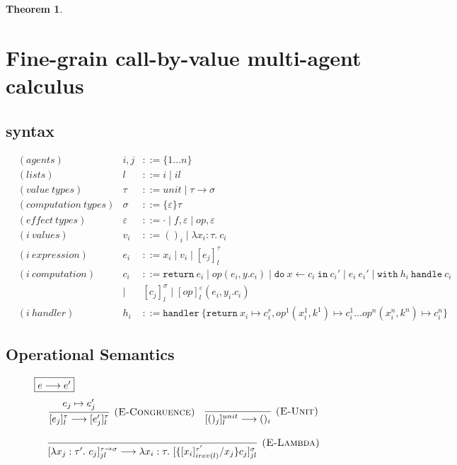 \documentclass{article}
\newtheorem{theorem}{Theorem}[section]
\begin{document}
\begin{theorem}



\newpage
\section{Fine-grain call-by-value multi-agent calculus}
\subsection{syntax}
\begin{align*}
&(agents) &i, j &::= \{1 \dots n\}\\
&(lists) & l &::= i \mid il\\
&(value\ types) &\tau &::= unit \mid \tau \rightarrow \sigma\\
&(computation\ types) &\sigma &::= \{\varepsilon\}\tau\\
&(effect\ types) &\varepsilon &::= \cdot \mid f, \varepsilon \mid op, \varepsilon\\
&(i\  values) &{v_i} &::= ()_i \mid \lambda x_i:\tau.\ c_i\\
&(i\ expression) &e_i &::= x_i \mid v_i \mid [e_j]^\tau_l \\
&(i\ computation) &c_i &::= \texttt{return}\ e_i \mid op(e_i, y.c_i) \mid \texttt{do}\ x \leftarrow c_i\ \texttt{in}\ c_i' \mid e_i\ e_i' \mid \texttt{with}\ h_i\ \texttt{handle}\ c_i\\
 &\ &\mid\ &[c_j]^\sigma_l \mid [op]^\varepsilon_l (e_i, y_i.c_i)\\
&(i\ handler) &h_i &::= \texttt{handler}\ \{\texttt{return}\ x_i \mapsto c^r_i, op^1(x_i^1, k^1) \mapsto c_i^1 \dots  op^n(x_i^n, k^n) \mapsto c_i^n\}  
\end{align*}

\subsection{Operational Semantics}
\begin{figure}[H]
\footnotesize{


$\fbox{$e \longrightarrow e'$}$
\[
\begin{array}{c}
\infer[\textsc{(E-Congruence)}]
  {[e_j]^\tau_l \longrightarrow [e_j']^\tau_l}
  {e_j \mapsto e_j'} \quad 

\infer[\textsc{(E-Unit)}]
  {[()_j]^{unit}_l \longrightarrow ()_i}
  {} \\[3ex]
  
\infer[\textsc{(E-Lambda)}]
  {[\lambda x_j : \tau'.\ c_j]^{\tau \rightarrow \sigma}_{jl} \longrightarrow \lambda x_i : \tau.\ [\{[x_i]^{\tau'}_{irev(l)}/x_j\}c_j]^\sigma_{jl}}
  {} \\[3ex]
\end{array}
\]

}
\end{figure}
\end{theorem}
\end{document}
